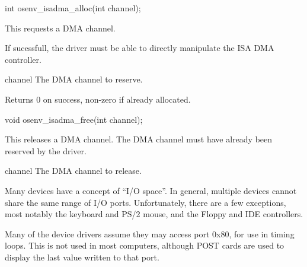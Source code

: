 
\begin{apisyn}
	\funcproto int osenv_isadma_alloc(int channel);
\end{apisyn}
\drvtoosn
\begin{apidesc}
	This requests a DMA channel.

	If sucessfull, the driver must be able to directly
manipulate the ISA DMA controller.

\end{apidesc}
\begin{apiparm}
	\item[channel]
		The DMA channel to reserve.
\end{apiparm}
\begin{apiret}
	Returns 0 on success, non-zero if already allocated.
\end{apiret}


\begin{apisyn}
	\funcproto void osenv_isadma_free(int channel);
\end{apisyn}
\drvtoosn
\begin{apidesc}
	This releases a DMA channel.
	The DMA channel must have already been reserved
	by the driver.
\end{apidesc}
\begin{apiparm}
	\item[channel]
		The DMA channel to release.
\end{apiparm}




Many devices have a concept of ``I/O space''.
In general, multiple devices cannot share the same
range of I/O ports.  Unfortunately, there are a few exceptions,
most notably the keyboard and PS/2 mouse, and the
Floppy and IDE controllers.

Many of the device drivers assume they may access port 0x80,
for use in timing loops.  This is not used in most computers,
although POST cards are used to display the last value written
to that port.


